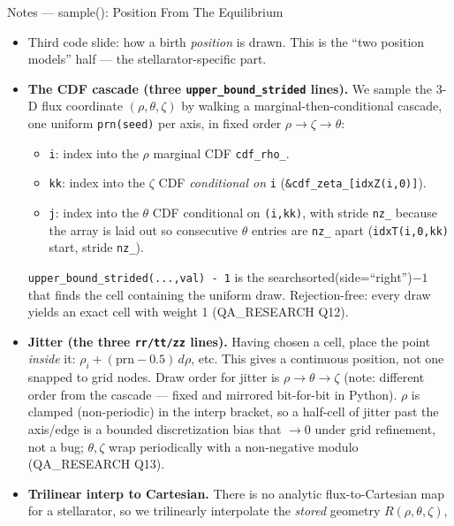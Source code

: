 \documentclass[11pt,aspectratio=169]{beamer}
\begin{document}
\begin{frame}[allowframebreaks]{Notes --- sample(): Position From The Equilibrium}
{\color{red}\footnotesize
\begin{itemize}
\item Third code slide: how a birth \emph{position} is drawn. This is the ``two position models''
      half --- the stellarator-specific part.
\item \textbf{The CDF cascade (three \texttt{upper\_bound\_strided} lines).} We sample the 3-D flux
      coordinate $(\rho,\theta,\zeta)$ by walking a marginal-then-conditional cascade, one uniform
      \texttt{prn(seed)} per axis, in fixed order $\rho\to\zeta\to\theta$:
      \begin{itemize}\scriptsize
      \item \texttt{i}: index into the $\rho$ marginal CDF \texttt{cdf\_rho\_}.
      \item \texttt{kk}: index into the $\zeta$ CDF \emph{conditional on} \texttt{i}
            (\texttt{\&cdf\_zeta\_[idxZ(i,0)]}).
      \item \texttt{j}: index into the $\theta$ CDF conditional on \texttt{(i,kk)}, with stride
            \texttt{nz\_} because the array is laid out so consecutive $\theta$ entries are
            \texttt{nz\_} apart (\texttt{idxT(i,0,kk)} start, stride \texttt{nz\_}).
      \end{itemize}
      \texttt{upper\_bound\_strided(...,val) - 1} is the searchsorted(side=``right'')$-1$ that finds
      the cell containing the uniform draw. Rejection-free: every draw yields an exact cell with
      weight 1 (QA\_RESEARCH Q12).
\item \textbf{Jitter (the three \texttt{rr/tt/zz} lines).} Having chosen a cell, place the point
      \emph{inside} it: $\rho_i + (\text{prn}-0.5)\,d\rho$, etc. This gives a continuous position, not
      one snapped to grid nodes. Draw order for jitter is $\rho\to\theta\to\zeta$ (note: different
      order from the cascade --- fixed and mirrored bit-for-bit in Python). $\rho$ is clamped
      (non-periodic) in the interp bracket, so a half-cell of jitter past the axis/edge is a bounded
      discretization bias that $\to 0$ under grid refinement, not a bug; $\theta,\zeta$ wrap
      periodically with a non-negative modulo (QA\_RESEARCH Q13).
\item \textbf{Trilinear interp to Cartesian.} There is no analytic flux-to-Cartesian map for a
      stellarator, so we trilinearly interpolate the \emph{stored} geometry $R(\rho,\theta,\zeta)$,

\end{itemize}}
\end{frame}
\end{document}
